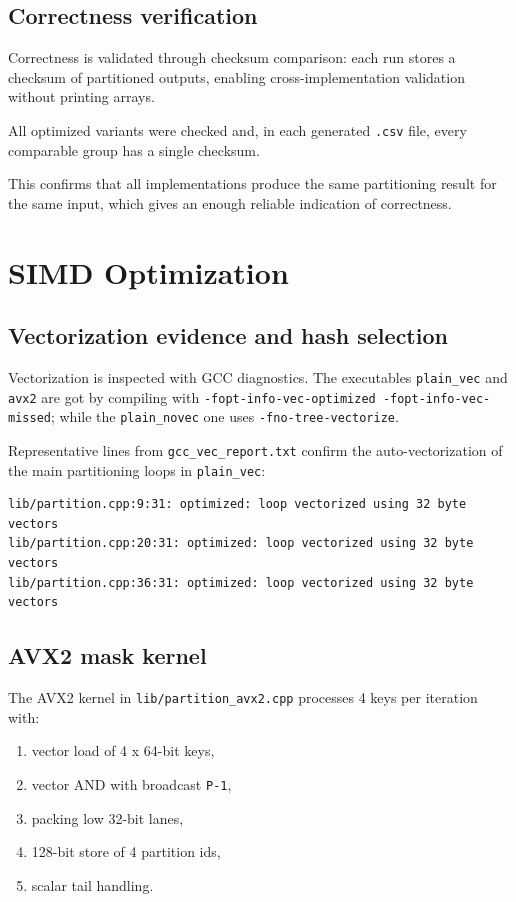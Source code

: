 \documentclass[11pt,a4paper]{article}
\begin{document}
\subsection{Correctness verification}
Correctness is validated through checksum comparison: each run stores a checksum of partitioned outputs, enabling cross-implementation validation without printing arrays.

All optimized variants were checked and, in each generated \texttt{.csv} file, every comparable group has a single checksum. 

This confirms that all implementations produce the same partitioning result for the same input, which gives an enough reliable indication of correctness.

\section{SIMD Optimization}
\subsection{Vectorization evidence and hash selection}
Vectorization is inspected with GCC diagnostics. The executables \texttt{plain\_vec} and \texttt{avx2} are got by compiling with \texttt{-fopt-info-vec-optimized -fopt-info-vec-missed}; while the \texttt{plain\_novec} one uses \texttt{-fno-tree-vectorize}.

Representative lines from \texttt{gcc\_vec\_report.txt} confirm the auto-vectorization of the main partitioning loops in \texttt{plain\_vec}:
\begin{verbatim}
lib/partition.cpp:9:31: optimized: loop vectorized using 32 byte vectors
lib/partition.cpp:20:31: optimized: loop vectorized using 32 byte vectors
lib/partition.cpp:36:31: optimized: loop vectorized using 32 byte vectors
\end{verbatim}

\subsection{AVX2 mask kernel}
The AVX2 kernel in \texttt{lib/partition\_avx2.cpp} processes 4 keys per iteration with:
\begin{enumerate}
    \item vector load of 4 x 64-bit keys,
    \item vector AND with broadcast \texttt{P-1},
    \item packing low 32-bit lanes,
    \item 128-bit store of 4 partition ids,
    \item scalar tail handling.
\end{enumerate}
\end{document}
